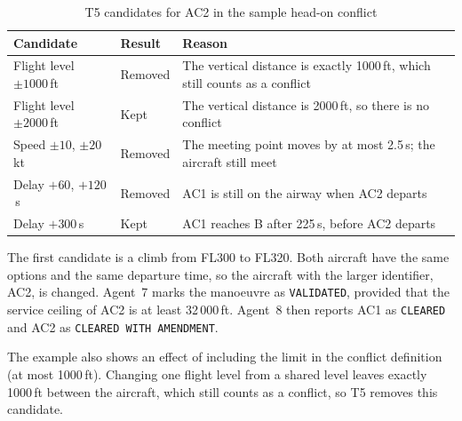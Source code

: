 \begin{table}[H]
\centering
\caption{T5 candidates for AC2 in the sample head-on conflict}
\label{tab:example}
\small
\begin{tabularx}{\linewidth}{@{}l l >{\raggedright\arraybackslash}X@{}}
\toprule
\textbf{Candidate} & \textbf{Result} & \textbf{Reason} \\
\midrule
Flight level $\pm 1000$\,ft & Removed & The vertical distance is exactly 1000\,ft, which still counts as a conflict \\
Flight level $\pm 2000$\,ft & Kept    & The vertical distance is 2000\,ft, so there is no conflict \\
Speed $\pm 10$, $\pm 20$\,kt & Removed & The meeting point moves by at most 2.5\,s; the aircraft still meet \\
Delay $+60$, $+120$\,s      & Removed & AC1 is still on the airway when AC2 departs \\
Delay $+300$\,s             & Kept    & AC1 reaches B after 225\,s, before AC2 departs \\
\bottomrule
\end{tabularx}
\end{table}

The first candidate is a climb from FL300 to FL320. Both aircraft have the same options and the same departure time, so the aircraft with the larger identifier, AC2, is changed. Agent~7 marks the manoeuvre as \texttt{VALIDATED}, provided that the service ceiling of AC2 is at least 32\,000\,ft. Agent~8 then reports AC1 as \texttt{CLEARED} and AC2 as \texttt{CLEARED WITH AMENDMENT}.

The example also shows an effect of including the limit in the conflict definition (at most 1000\,ft). Changing one flight level from a shared level leaves exactly 1000\,ft between the aircraft, which still counts as a conflict, so T5 removes this candidate.
